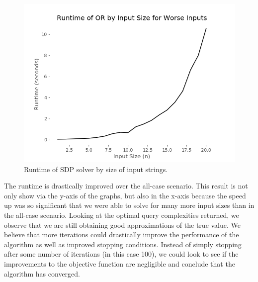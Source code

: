 \begin{figure}[ht]
\centering
\includegraphics[scale=.4]{figures/or_worst_runtime.png}
\caption{Runtime of SDP solver by size of input strings.}
\label{fig:or_worst_runtime}
\end{figure}

The runtime is drastically improved over the all-case scenario. 
This result is not only show via the y-axis of the graphs, 
but also in the x-axis because the speed up was so 
significant that we were able to solve for many more 
input sizes than in the all-case scenario. 
Looking at the optimal query complexities returned, 
we observe that we are still obtaining good 
approximations of the true value. 
We believe that more iterations could drastically 
improve the performance of the algorithm as well as 
improved stopping conditions. Instead of simply stopping 
after some number of iterations (in this case 100), 
we could look to see if the improvements to the objective 
function are negligible and conclude that the algorithm has converged.
